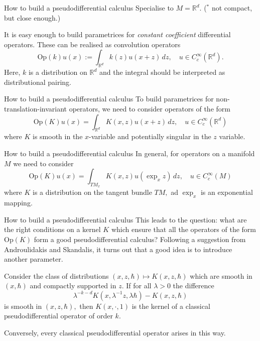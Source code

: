 \documentclass{beamer}
\numberwithin{equation}{section}
\theoremstyle{plain}
\theoremstyle{plain}
\theoremstyle{definition}
\theoremstyle{plain}
\theoremstyle{plain}
\theoremstyle{definition}
\newcommand{\Rl}{\mathbb{R}}
\newcommand{\Op}{\mathrm{Op}}
\begin{document}
\begin{frame}{How to build a pseudodifferential calculus}
    Specialise to $M = \Rl^d.$ ($^*$ not compact, but close enough.)
    
    It is easy enough to build parametrices for \emph{constant coefficient} differential operators. These can be realised as convolution operators
    \[
        \Op(k)u(x) := \int_{\Rl^d} k(z)u(x+z)\,dz,\quad u\in C^\infty_c(\Rl^d).
    \]
    Here, $k$ is a distribution on $\Rl^d$ and the integral should be interpreted as distributional pairing.
\end{frame}

\begin{frame}{How to build a pseudodifferential calculus}
    To build parametrices for non-translation-invariant operators, we need to consider operators of the form
    \[
        \Op(K)u(x) = \int_{\Rl^d} K(x,z)u(x+z)\, dz,\quad u\in C^\infty_c(\Rl^d)
    \]
    where $K$ is smooth in the $x$-variable and potentially singular in the $z$ variable.
\end{frame}

\begin{frame}{How to build a pseudodifferential calculus}
    In general, for operators on a manifold $M$ we need to consider
    \[
        \Op(K)u(x) = \int_{TM_x} K(x,z)u(\exp_xz)\,dz,\quad u\in C^\infty_c(M)
    \]
    where $K$ is a distribution on the tangent bundle $TM,$ ad $\exp_x$ is an exponential mapping.
\end{frame}

\begin{frame}{How to build a pseudodifferential calculus}
    This leads to the question: what are the right conditions on a kernel $K$ which ensure that all the operators of the form $\Op(K)$ form a good pseudodifferential calculus? \pause
    Following a suggestion from Androulidakis and Skandalis, it turns out that a good idea is to introduce another parameter.
    \begin{theorem}
        Consider the class of distributions $(x,z,\hbar) \mapsto K(x,z,\hbar)$ which are smooth in $(x,\hbar)$ and compactly supported in $z.$ If for all $\lambda>0$ the difference
        \[
            \lambda^{-k-d}K(x,\lambda^{-1}z,\lambda \hbar)-K(x,z,\hbar)
        \]
        is smooth in $(x,z,\hbar),$ then $K(x,\cdot,1)$ is the kernel of a classical pseudodifferential operator of order $k.$
        
        Conversely, every classical pseudodifferential operator arises in this way.
    \end{theorem}
\end{frame}
\end{document}
